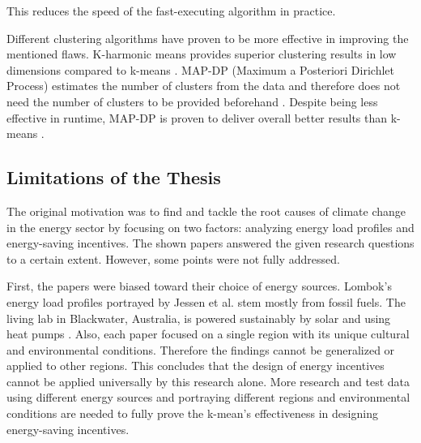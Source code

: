 \begin{description}
    This reduces the speed of the fast-executing algorithm in practice.
\end{description}

Different clustering algorithms have proven to be more effective in improving the mentioned flaws.
K-harmonic means provides superior clustering results in low dimensions compared to k-means \cite{HAM-ALT}.
MAP-DP (Maximum a Posteriori Dirichlet Process) estimates the number of clusters from the data and therefore does not need the number of clusters to be provided beforehand \cite{RAY-ALT}.
Despite being less effective in runtime, MAP-DP is proven to deliver overall better results than k-means \cite{RAY-ALT}.

\subsection{Limitations of the Thesis}
The original motivation was to find and tackle the root causes of climate change in the energy sector by focusing on two factors: analyzing energy load profiles and energy-saving incentives.
The shown papers answered the given research questions to a certain extent.
However, some points were not fully addressed.

First, the papers were biased toward their choice of energy sources.
Lombok's energy load profiles portrayed by Jessen et al. \cite{JES-IND} stem mostly from fossil fuels.
The living lab in Blackwater, Australia, is powered sustainably by solar and using heat pumps \cite{MAL-HBP}.
Also, each paper focused on a single region with its unique cultural and environmental conditions.
Therefore the findings cannot be generalized or applied to other regions.
This concludes that the design of energy incentives cannot be applied universally by this research alone.
More research and test data using different energy sources and portraying different regions and environmental conditions are needed to fully prove the k-mean's effectiveness in designing energy-saving incentives. 

